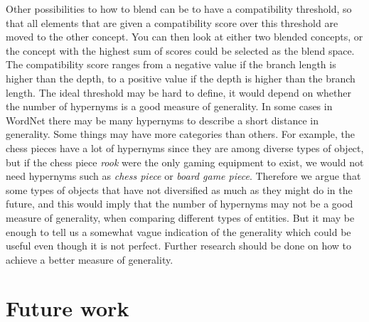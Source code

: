 Other possibilities to how to blend can be to have a compatibility threshold, so that all elements that are given a compatibility score over this threshold are moved to the other concept. You can then look at either two blended concepts, or the concept with the highest sum of scores could be selected as the blend space. The compatibility score ranges from a negative value if the branch length is higher than the depth, to a positive value if the depth is higher than the branch length. The ideal threshold may be hard to define, it would depend on whether the number of hypernyms is a good measure of generality. In some cases in WordNet there may be many hypernyms to describe a short distance in generality. Some things may have more categories than others. For example, the chess pieces have a lot of hypernyms since they are among diverse types of object, but if the chess piece \emph{rook} were the only gaming equipment to exist, we would not need hypernyms such as \emph{chess piece} or \emph{board game piece}. Therefore we argue that some types of objects that have not diversified as much as they might do in the future, and this would imply that the number of hypernyms may not be a good measure of generality, when comparing different types of entities. But it may be enough to tell us a somewhat vague indication of the generality which could be useful even though it is not perfect. Further research should be done on how to achieve a better measure of generality.


\section{Future work}